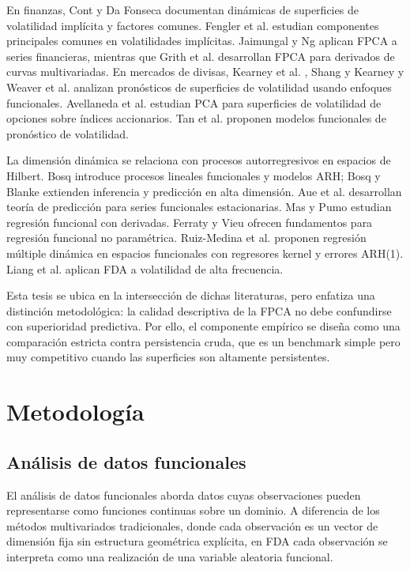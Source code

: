 \documentclass[a4paper,11pt]{article}
\begin{document}
En finanzas, Cont y Da Fonseca \cite{ContDaFonseca2002} documentan dinámicas de superficies de volatilidad implícita y factores comunes. Fengler et al. \cite{Fengler2003} estudian componentes principales comunes en volatilidades implícitas. Jaimungal y Ng \cite{JaimungalNg2007} aplican FPCA a series financieras, mientras que Grith et al. \cite{Grith2018} desarrollan FPCA para derivados de curvas multivariadas. En mercados de divisas, Kearney et al. \cite{Kearney2018}, Shang y Kearney \cite{ShangKearney2022} y Weaver et al. \cite{Weaver2020} analizan pronósticos de superficies de volatilidad usando enfoques funcionales. Avellaneda et al. \cite{Avellaneda2020} estudian PCA para superficies de volatilidad de opciones sobre índices accionarios. Tan et al. \cite{Tan2024} proponen modelos funcionales de pronóstico de volatilidad.

La dimensión dinámica se relaciona con procesos autorregresivos en espacios de Hilbert. Bosq \cite{Bosq2000} introduce procesos lineales funcionales y modelos ARH; Bosq y Blanke \cite{BosqBlanke2007} extienden inferencia y predicción en alta dimensión. Aue et al. \cite{Aue2015} desarrollan teoría de predicción para series funcionales estacionarias. Mas y Pumo \cite{MasPumo2009} estudian regresión funcional con derivadas. Ferraty y Vieu \cite{FerratyVieu2006} ofrecen fundamentos para regresión funcional no paramétrica. Ruiz-Medina et al. \cite{RuizMedina2019} proponen regresión múltiple dinámica en espacios funcionales con regresores kernel y errores ARH(1). Liang et al. \cite{Liang2022} aplican FDA a volatilidad de alta frecuencia.

Esta tesis se ubica en la intersección de dichas literaturas, pero enfatiza una distinción metodológica: la calidad descriptiva de la FPCA no debe confundirse con superioridad predictiva. Por ello, el componente empírico se diseña como una comparación estricta contra persistencia cruda, que es un benchmark simple pero muy competitivo cuando las superficies son altamente persistentes.

\section{Metodología}

\subsection{Análisis de datos funcionales}

El análisis de datos funcionales aborda datos cuyas observaciones pueden representarse como funciones continuas sobre un dominio. A diferencia de los métodos multivariados tradicionales, donde cada observación es un vector de dimensión fija sin estructura geométrica explícita, en FDA cada observación se interpreta como una realización de una variable aleatoria funcional.
\end{document}
